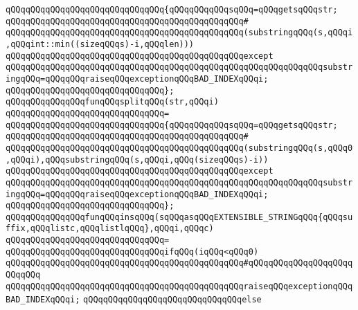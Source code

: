 \verb|qQQqqQQqqQQqqQQqqQQqqQQqqQQqqQQq{qQQqqQQqqQQqsqQQq=qQQqgetsqQQqstr;|\newline
\verb|qQQqqQQqqQQqqQQqqQQqqQQqqQQqqQQqqQQqqQQqqQQqqQQq#|\newline
\verb|qQQqqQQqqQQqqQQqqQQqqQQqqQQqqQQqqQQqqQQqqQQqqQQq(substringqQQq(s,qQQqi,qQQqint::min((sizeqQQqs)-i,qQQqlen)))|\newline
\verb|qQQqqQQqqQQqqQQqqQQqqQQqqQQqqQQqqQQqqQQqqQQqqQQqexcept|\newline
\verb|qQQqqQQqqQQqqQQqqQQqqQQqqQQqqQQqqQQqqQQqqQQqqQQqqQQqqQQqqQQqqQQqsubstringqQQq=qQQqqQQqraiseqQQqexceptionqQQqBAD_INDEXqQQqi;|\newline
\verb|qQQqqQQqqQQqqQQqqQQqqQQqqQQqqQQq};|\newline
\newline
\newline
\verb|qQQqqQQqqQQqqQQqfunqQQqsplitqQQq(str,qQQqi)|\newline
\verb|qQQqqQQqqQQqqQQqqQQqqQQqqQQqqQQq=|\newline
\verb|qQQqqQQqqQQqqQQqqQQqqQQqqQQqqQQq{qQQqqQQqqQQqsqQQq=qQQqgetsqQQqstr;|\newline
\verb|qQQqqQQqqQQqqQQqqQQqqQQqqQQqqQQqqQQqqQQqqQQqqQQq#|\newline
\verb|qQQqqQQqqQQqqQQqqQQqqQQqqQQqqQQqqQQqqQQqqQQqqQQq(substringqQQq(s,qQQq0,qQQqi),qQQqsubstringqQQq(s,qQQqi,qQQq(sizeqQQqs)-i))|\newline
\verb|qQQqqQQqqQQqqQQqqQQqqQQqqQQqqQQqqQQqqQQqqQQqqQQqexcept|\newline
\verb|qQQqqQQqqQQqqQQqqQQqqQQqqQQqqQQqqQQqqQQqqQQqqQQqqQQqqQQqqQQqqQQqsubstringqQQq=qQQqqQQqraiseqQQqexceptionqQQqBAD_INDEXqQQqi;|\newline
\verb|qQQqqQQqqQQqqQQqqQQqqQQqqQQqqQQq};|\newline
\newline
\newline
\verb|qQQqqQQqqQQqqQQqfunqQQqinsqQQq(sqQQqasqQQqEXTENSIBLE_STRINGqQQq{qQQqsuffix,qQQqlistc,qQQqlistlqQQq},qQQqi,qQQqc)|\newline
\verb|qQQqqQQqqQQqqQQqqQQqqQQqqQQqqQQq=|\newline
\verb|qQQqqQQqqQQqqQQqqQQqqQQqqQQqqQQqifqQQq(iqQQq<qQQq0)|\newline
\verb|qQQqqQQqqQQqqQQqqQQqqQQqqQQqqQQqqQQqqQQqqQQqqQQq#qQQqqQQqqQQqqQQqqQQqqQQqqQQq|\newline
\verb|qQQqqQQqqQQqqQQqqQQqqQQqqQQqqQQqqQQqqQQqqQQqqQQqraiseqQQqexceptionqQQqBAD_INDEXqQQqi;|\newline
\verb|qQQqqQQqqQQqqQQqqQQqqQQqqQQqqQQqelse|\newline
